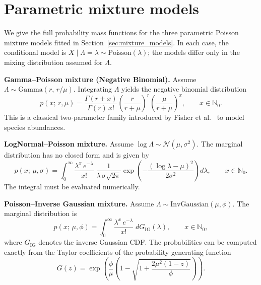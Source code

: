 ﻿\documentclass{article}
\begin{document}
\clearpage
\appendix

\section{Parametric mixture models}\label{app:parametric_models}

We give the full probability mass functions for the three parametric Poisson mixture models fitted in Section~\ref{sec:mixture_models}. In each case, the conditional model is $X \mid \Lambda = \lambda \sim \mathrm{Poisson}(\lambda)$; the models differ only in the mixing distribution assumed for $\Lambda$.

\textbf{Gamma--Poisson mixture (Negative Binomial).}\;
Assume $\Lambda \sim \mathrm{Gamma}(r,\, r/\mu)$.
Integrating $\Lambda$ yields the negative binomial distribution
\[
p(x;\,r,\mu)
= \frac{\Gamma(r+x)}{\Gamma(r)\,x!}
  \left(\frac{r}{r+\mu}\right)^{\!r}
  \left(\frac{\mu}{r+\mu}\right)^{\!x},
\qquad x \in \mathbb{N}_0.
\]
This is a classical two-parameter family introduced by
Fisher et al.~\cite{fisher1943} to model species abundances.

\textbf{LogNormal--Poisson mixture.}\;
Assume $\log\Lambda \sim \mathcal{N}(\mu,\sigma^2)$.
The marginal distribution has no closed form and is given by
\[
p(x;\,\mu,\sigma)
= \int_0^\infty
  \frac{\lambda^x\, e^{-\lambda}}{x!}\;
  \frac{1}{\lambda\,\sigma\sqrt{2\pi}}
  \exp\!\left(-\frac{(\log\lambda - \mu)^2}{2\sigma^2}\right)
  d\lambda,
\qquad x \in \mathbb{N}_0.
\]
The integral must be evaluated numerically.


\textbf{Poisson--Inverse Gaussian mixture.}
Assume $\Lambda \sim \mathrm{InvGaussian}(\mu,\phi)$.
The marginal distribution is
\[
p(x;\,\mu,\phi)
= \int_0^\infty
  \frac{\lambda^x\, e^{-\lambda}}{x!}\;
  dG_{\mathrm{IG}}(\lambda),
\qquad x \in \mathbb{N}_0,
\]
where $G_{\mathrm{IG}}$ denotes the inverse Gaussian CDF. The
probabilities can be computed exactly from the Taylor coefficients of
the probability generating function
\[
G(z)
= \exp\!\left(
  \frac{\phi}{\mu}
  \left(1 - \sqrt{1 + \frac{2\mu^2(1-z)}{\phi}}\right)
\right).
\]
\end{document}
